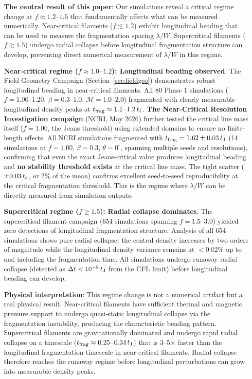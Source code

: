 \documentclass[twoside,twocolumn]{mnras}
\begin{document}
\textbf{The central result of this paper}: Our simulations reveal a critical regime change at $f \approx 1.2$--$1.5$ that fundamentally affects what can be measured numerically. Near-critical filaments ($f \lesssim 1.2$) exhibit longitudinal beading that can be used to measure the fragmentation spacing $\lambda/W$. Supercritical filaments ($f \gtrsim 1.5$) undergo radial collapse before longitudinal fragmentation structure can develop, preventing direct numerical measurement of $\lambda/W$ in this regime.

\textbf{Near-critical regime ($f \approx 1.0$--$1.2$): Longitudinal beading observed}. The Field Geometry Campaign (Section~\ref{sec:fieldgeo}) demonstrates robust longitudinal beading in near-critical filaments. All 80 Phase 1 simulations ($f = 1.00$--$1.20$, $\beta = 0.3$--$1.0$, $\mathcal{M} = 1.0$--$2.0$) fragmented with clearly measurable longitudinal density peaks at $t_{\rm frag} \approx 1.1$--$1.2\,t_{\rm J}$. \textbf{The Near-Critical Resolution Investigation campaign} (NCRI, May 2026) further tested the critical line mass itself ($f = 1.00$, the Jeans threshold) using extended domains to ensure no finite-length effects. All NCRI simulations fragmented with $t_{\rm frag} = 1.62 \pm 0.03\,t_{\rm J}$ (14 simulations at $f = 1.00$, $\beta = 0.3$, $\theta = 0^{\circ}$, spanning multiple seeds and resolutions), confirming that even the exact Jeans-critical value produces longitudinal beading and \textbf{no stability threshold exists} at the critical line mass. The tight scatter ($\pm 0.03\,t_{\rm J}$, or 2\% of the mean) confirms excellent seed-to-seed reproducibility at the critical fragmentation threshold. This is the regime where $\lambda/W$ can be directly measured from simulation outputs.

\textbf{Supercritical regime ($f \geq 1.5$): Radial collapse dominates}. The supercritical filament campaign (654 simulations spanning $f = 1.5$--$3.0$) yielded zero detections of longitudinal fragmentation structure. Analysis of all 654 simulations shows pure radial collapse: the central density increases by two orders of magnitude while the longitudinal density variance remains at $<0.02\%$ up to and including the fragmentation time. All simulations undergo runaway radial collapse (detected as $\Delta t < 10^{-8}\,t_{\rm J}$ from the CFL limit) before longitudinal beading can develop.

\textbf{Physical interpretation}: This regime change is not a numerical artifact but a real physical result. Near-critical filaments have sufficient thermal and magnetic pressure support to undergo quasi-static longitudinal collapse via the fragmentation instability, producing the characteristic beading pattern. Supercritical filaments are gravitationally dominated and undergo rapid radial collapse on a timescale ($t_{\rm frag} \approx 0.25$--$0.34\,t_{\rm J}$) that is 3--5$\times$ faster than the longitudinal fragmentation timescale in near-critical filaments. Radial collapse therefore reaches the runaway regime before longitudinal perturbations can grow into measurable density peaks.
\end{document}
